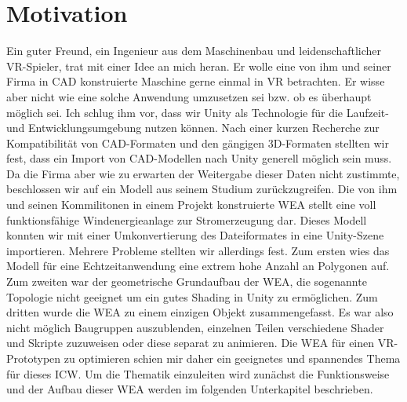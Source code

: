 \section{Motivation}
\label{sec:Motivation}
Ein guter Freund, ein Ingenieur aus dem Maschinenbau und leidenschaftlicher VR-Spieler, trat mit einer Idee an mich heran. Er wolle eine von ihm und seiner Firma in CAD  konstruierte Maschine gerne einmal in VR betrachten. Er wisse aber nicht wie eine solche Anwendung umzusetzen sei bzw. ob es überhaupt möglich sei. Ich schlug ihm vor, dass wir Unity als Technologie für die Laufzeit- und Entwicklungsumgebung nutzen können. Nach einer kurzen Recherche  zur Kompatibilität von CAD-Formaten und den gängigen 3D-Formaten stellten wir fest, dass ein Import von CAD-Modellen nach Unity generell möglich sein muss. Da die Firma aber wie zu erwarten der Weitergabe dieser Daten nicht zustimmte, beschlossen wir auf ein Modell aus seinem Studium zurückzugreifen. Die von ihm und seinen Kommilitonen in einem Projekt konstruierte WEA stellt eine voll funktionsfähige Windenergieanlage zur Stromerzeugung dar. Dieses Modell konnten wir mit einer Umkonvertierung des Dateiformates in eine Unity-Szene importieren. Mehrere Probleme stellten wir allerdings fest. Zum ersten wies das Modell für eine Echtzeitanwendung eine extrem hohe  Anzahl an Polygonen auf. Zum zweiten war der geometrische Grundaufbau der WEA, die sogenannte Topologie nicht geeignet um ein gutes Shading in Unity zu ermöglichen. Zum dritten wurde die WEA zu einem einzigen Objekt zusammengefasst. Es war also nicht möglich Baugruppen auszublenden, einzelnen Teilen verschiedene Shader und  Skripte zuzuweisen oder diese separat zu animieren. Die WEA für einen VR-Prototypen zu optimieren schien mir daher ein geeignetes und spannendes Thema für dieses ICW. 
Um die Thematik einzuleiten wird zunächst die Funktionsweise und der Aufbau dieser WEA werden im folgenden Unterkapitel  beschrieben.




